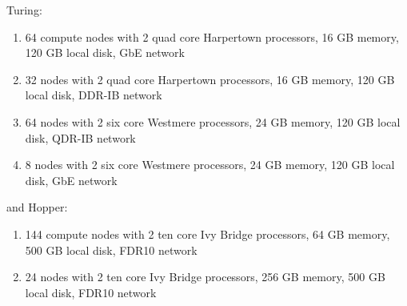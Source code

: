 \ifantwerpen
Turing:
  \begin{enumerate}
    \item  64 compute nodes with 2 quad core Harpertown processors, 16 GB
    memory, 120 GB local disk, GbE network
    \item  32 nodes with 2 quad core Harpertown processors, 16 GB memory,
           120 GB local disk, DDR-IB network
    \item  64 nodes with 2 six core Westmere processors, 24 GB memory,
           120 GB local disk, QDR-IB network
    \item  8 nodes with 2 six core Westmere processors, 24 GB memory,
           120 GB local disk, GbE network
  \end{enumerate}
and Hopper:
  \begin{enumerate}
    \item  144 compute nodes with 2 ten core Ivy Bridge processors, 64 GB
    memory, 500 GB local disk, FDR10 network
    \item  24 nodes with 2 ten core Ivy Bridge processors, 256 GB memory,
           500 GB local disk, FDR10 network
  \end{enumerate}
\fi
\ifleuven
